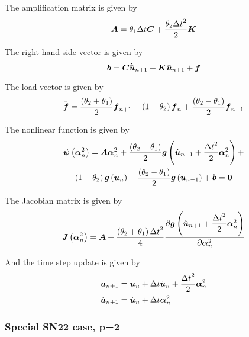 The amplification matrix is given by
\begin{equation}
  \matr{A}=\theta_{1}\Delta t\matr{C}+\dfrac{\theta_{2}{\Delta t}^{2}}{2}\matr{K}
\end{equation}

The right hand side vector is given by
\begin{equation}
  \vectr{b}=\matr{C}\dot{\bar{\vectr{u}}}_{n+1}+\matr{K}\bar{\vectr{u}}_{n+1}+\bar{\vectr{f}}
\end{equation}

The load vector is given by
\begin{equation}
  \bar{\boldsymbol{f}}=\dfrac{\left( \theta_{2}+\theta_{1} \right)}{2}\boldsymbol{f}_{n+1}+\left( 1-\theta_{2} \right)\boldsymbol{f}_{n}
  +\dfrac{\left( \theta_{2}-\theta_{1} \right)}{2}\boldsymbol{f}_{n-1}
\end{equation}

The nonlinear function is given by
\begin{multline}
  \fnof{\vectr{\psi}}{\vectr{\alpha}^{2}_{n}}=\matr{A}\vectr{\alpha}^{2}_{n}+\dfrac{\pbrac{\theta_{2}+\theta_{1}}}{2}\fnof{\vectr{g}}{\hat{\vectr{u}}_{n+1}+
    \dfrac{{\Delta t}^{2}}{2}\vectr{\alpha}^{2}_{n}}+\\
  \pbrac{1-\theta_{2}}\fnof{\vectr{g}}{\vectr{u}_{n}}+\dfrac{\pbrac{\theta_{2}-\theta_{1}}}{2}\fnof{\vectr{g}}{\vectr{u}_{n-1}}+\vectr{b}=\vectr{0}
\end{multline}

The Jacobian matrix is given by
\begin{equation}
  \fnof{\matr{J}}{\vectr{\alpha}^{2}_{n}}=\matr{A}+\dfrac{\pbrac{\theta_{2}+\theta_{1}}{\Delta t}^{2}}{4}
  \delby{\fnof{\vectr{g}}{\hat{\vectr{u}}_{n+1}+\dfrac{{\Delta t}^{2}}{2}\vectr{\alpha}^{2}_{n}}}{\vectr{\alpha}^{2}_{n}}
\end{equation}

And the time step update is given by
\begin{equation}
  \begin{split}
    \boldsymbol{u}_{n+1} &= \boldsymbol{u}_{n}+\Delta t\dot{\boldsymbol{u}}_{n} +\dfrac{{\Delta t}^{2}}{2}\boldsymbol{\alpha}^{2}_{n} \\
    \dot{\boldsymbol{u}}_{n+1} &= \dot{\boldsymbol{u}}_{n}+\Delta t\boldsymbol{\alpha}^{2}_{n}
  \end{split}
\end{equation}

\subsubsection{Special SN22 case, p=2}

